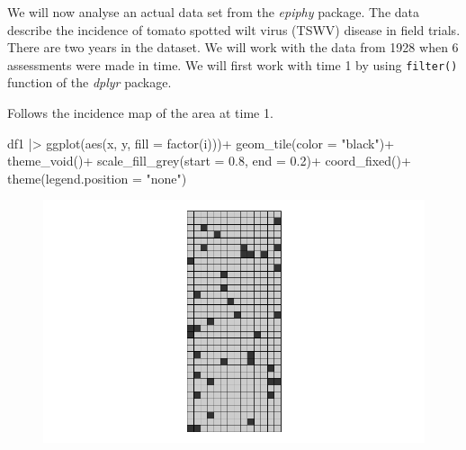 \documentclass[
  letterpaper,
  DIV=11,
  numbers=noendperiod]{scrreprt}
\newenvironment{Shaded}{\begin{snugshade}}{\end{snugshade}}
\newcommand{\AttributeTok}[1]{\textcolor[rgb]{0.40,0.45,0.13}{#1}}
\newcommand{\CommentTok}[1]{\textcolor[rgb]{0.37,0.37,0.37}{#1}}
\newcommand{\DecValTok}[1]{\textcolor[rgb]{0.68,0.00,0.00}{#1}}
\newcommand{\FloatTok}[1]{\textcolor[rgb]{0.68,0.00,0.00}{#1}}
\newcommand{\FunctionTok}[1]{\textcolor[rgb]{0.28,0.35,0.67}{#1}}
\newcommand{\NormalTok}[1]{\textcolor[rgb]{0.00,0.23,0.31}{#1}}
\newcommand{\OtherTok}[1]{\textcolor[rgb]{0.00,0.23,0.31}{#1}}
\newcommand{\SpecialCharTok}[1]{\textcolor[rgb]{0.37,0.37,0.37}{#1}}
\newcommand{\StringTok}[1]{\textcolor[rgb]{0.13,0.47,0.30}{#1}}
\begin{document}
We will now analyse an actual data set from the \emph{epiphy} package.
The data describe the incidence of tomato spotted wilt virus (TSWV)
disease in field trials. There are two years in the dataset. We will
work with the data from 1928 when 6 assessments were made in time. We
will first work with time 1 by using \texttt{filter()} function of the
\emph{dplyr} package.

\begin{Shaded}
\end{Shaded}

Follows the incidence map of the area at time 1.

\begin{Shaded}
\begin{Highlighting}[]
\NormalTok{df1 }\SpecialCharTok{|\textgreater{}} 
  \FunctionTok{ggplot}\NormalTok{(}\FunctionTok{aes}\NormalTok{(x, y, }\AttributeTok{fill =} \FunctionTok{factor}\NormalTok{(i)))}\SpecialCharTok{+}
  \FunctionTok{geom\_tile}\NormalTok{(}\AttributeTok{color =} \StringTok{"black"}\NormalTok{)}\SpecialCharTok{+}
  \FunctionTok{theme\_void}\NormalTok{()}\SpecialCharTok{+}
  \FunctionTok{scale\_fill\_grey}\NormalTok{(}\AttributeTok{start =} \FloatTok{0.8}\NormalTok{, }\AttributeTok{end =} \FloatTok{0.2}\NormalTok{)}\SpecialCharTok{+}
  \FunctionTok{coord\_fixed}\NormalTok{()}\SpecialCharTok{+}
  \FunctionTok{theme}\NormalTok{(}\AttributeTok{legend.position =} \StringTok{"none"}\NormalTok{)}
\end{Highlighting}
\end{Shaded}

\begin{figure}[H]

{\centering \includegraphics{spatial-tests_files/figure-pdf/unnamed-chunk-15-1.pdf}

}

\end{figure}
\end{document}
